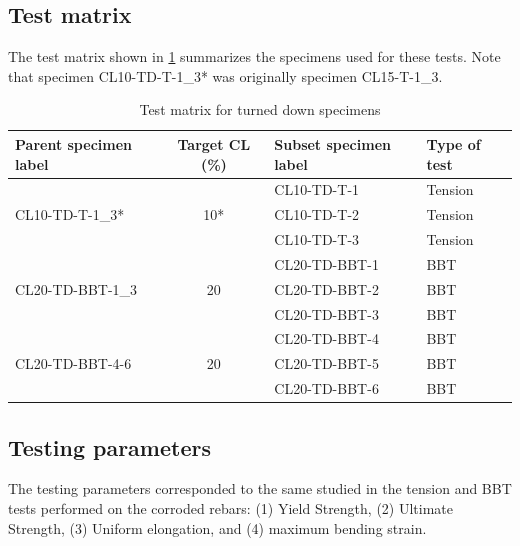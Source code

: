 \subsection{Test matrix}

The test matrix shown in \ref{tab:turned_down_matrix} summarizes the specimens used for these tests. Note that specimen CL10-TD-T-1\_3* was originally specimen CL15-T-1\_3.

\begin{table}[htbp]
\caption{Test matrix for turned down specimens}
\label{tab:turned_down_matrix}
\centering
\begin{tabular}{lcll}
Parent specimen label             & Target CL (\%)       & Subset specimen label & Type of test \\ \hline
\multirow{3}{*}{CL10-TD-T-1\_3*}  & \multirow{3}{*}{10*} & CL10-TD-T-1           & Tension      \\
                                  &                      & CL10-TD-T-2           & Tension      \\
                                  &                      & CL10-TD-T-3           & Tension      \\
\multirow{3}{*}{CL20-TD-BBT-1\_3} & \multirow{3}{*}{20}  & CL20-TD-BBT-1         & BBT          \\
                                  &                      & CL20-TD-BBT-2         & BBT          \\
                                  &                      & CL20-TD-BBT-3         & BBT          \\
\multirow{3}{*}{CL20-TD-BBT-4-6}  & \multirow{3}{*}{20}  & CL20-TD-BBT-4         & BBT          \\
                                  &                      & CL20-TD-BBT-5         & BBT          \\
                                  &                      & CL20-TD-BBT-6         & BBT         
\end{tabular}
\end{table}

\subsection{Testing parameters}
The testing parameters corresponded to the same studied in the tension and BBT tests performed on the corroded rebars: (1) Yield Strength, (2) Ultimate Strength, (3) Uniform elongation, and (4) maximum bending strain.

